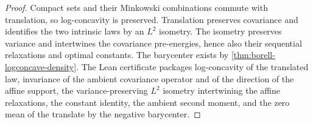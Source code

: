 \begin{proof}
  \leanok
  Compact sets and their Minkowski combinations commute with translation, so log-concavity is
  preserved.  Translation preserves covariance and identifies the two intrinsic laws by an
  $L^2$ isometry.  The isometry preserves variance and intertwines the covariance pre-energies,
  hence also their sequential relaxations and optimal constants.  The barycenter exists by
  \cref{thm:borell-logconcave-density}.
  The Lean certificate packages log-concavity of the translated law, invariance of the ambient
  covariance operator and of the direction of the affine support, the variance-preserving $L^2$
  isometry intertwining the affine relaxations, the constant identity, the ambient second moment,
  and the zero mean of the translate by the negative barycenter.
\end{proof}

